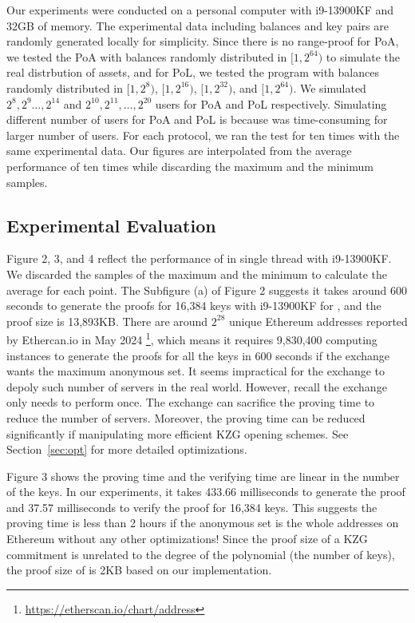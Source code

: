 Our experiments were conducted on a personal computer with i9-13900KF and 32GB of memory. The experimental data including balances and \secp key pairs are randomly generated locally for simplicity. Since there is no range-proof for PoA, we tested the PoA with balances randomly distributed in $[1,2^{64})$ to simulate the real distrbution of assets, and for PoL, we tested the program with balances randomly distributed in $[1,2^8)$, $[1,2^{16})$, $[1,2^{32})$, and $[1,2^{64})$. We simulated $2^8,2^9\dots,2^{14}$ and $2^{10},2^{11},\dots,2^{20}$ users for PoA and PoL respectively. Simulating different number of users for PoA and PoL is because \bootstrap was time-consuming for larger number of users. For each protocol, we ran the test for ten times with the same experimental data. Our figures are interpolated from the average performance of ten times while discarding the maximum and the minimum samples.

\subsection{Experimental Evaluation}
Figure 2, 3, and 4 reflect the performance of \Sys in single thread with i9-13900KF. We discarded the samples of the maximum and the minimum to calculate the average for each point. The Subfigure (a) of Figure 2 suggests it takes around 600 seconds to generate the proofs for 16,384 keys with i9-13900KF for \bootstrap, and the proof size is 13,893KB. There are around $2^{28}$ unique Ethereum addresses reported by Ethercan.io in May 2024 \footnote{\url{https://etherscan.io/chart/address}}, which means it requires 9,830,400 computing instances to generate the proofs for all the keys in 600 seconds if the exchange wants the maximum anonymous set. It seems impractical for the exchange to depoly such number of servers in the real world. However, recall the exchange only needs to perform \bootstrap once. The exchange can sacrifice the proving time to reduce the number of servers. Moreover, the proving time can be reduced significantly if manipulating more efficient KZG opening schemes. See Section~\ref{sec:opt} for more detailed optimizations. 

Figure 3 shows the proving time and the verifying time are linear in the number of the keys. In our experiments, it takes 433.66 milliseconds to generate the proof and 37.57 milliseconds to verify the proof for 16,384 keys. This suggests the proving time is less than 2 hours if the anonymous set is the whole addresses on Ethereum without any other optimizations! Since the proof size of a KZG commitment is unrelated to the degree of the polynomial (the number of keys), the proof size of \poa is 2KB based on our implementation.

